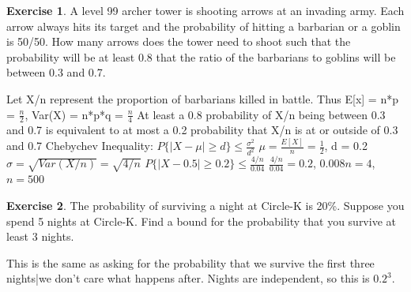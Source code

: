 \documentclass[12pt]{amsart}
\theoremstyle{definition}
\newtheorem{exercise}{Exercise}
\numberwithin{equation}{section}
\theoremstyle{plain}
\begin{document}
 


 
\begin{exercise}
A level 99 archer tower is shooting arrows at an invading army. Each arrow always hits its target and the probability of hitting a barbarian or a goblin is 50/50. How many arrows does the tower need to shoot such that the probability will be at least 0.8 that the ratio of the barbarians to goblins will be between 0.3 and 0.7.
\begin{answer}
Let X/n represent the proportion of barbarians killed in battle. Thus E[x] = n*p = $\frac{n}{2}$, Var(X) = n*p*q = $\frac{n}{4}$
\newline
At least a 0.8 probability of X/n being between 0.3 and 0.7 is equivalent to at most a 0.2 probability that X/n is at or outside of 0.3 and 0.7
\newline
Chebychev Inequality: $P\{|X-\mu| \geq d\} \leq \frac{\sigma^2}{d^2}$
\newline
$\mu = \frac{E[X]}{n} = \frac{1}{2}$, d = 0.2
\newline
$\sigma = \sqrt{Var(X/n)} = \sqrt{4/n}$
\newline
$P\{|X-0.5| \geq 0.2\} \leq \frac{4/n}{0.04}$
\newline
$\frac{4/n}{0.04} = 0.2$, $0.008n = 4$, $n=500$
\end{answer}
\end{exercise}


 

\begin{exercise}
The probability of surviving a night at Circle-K is 20\%. Suppose you spend 5 nights at Circle-K. Find a bound for the probability that you survive at least 3 nights.
\begin{answer}
    This is the same as asking for the probability that we survive the first three nights|we don't care what happens after. Nights are independent, so this is $0.2^3$.
\end{answer}
\end{exercise}

 
\end{document}
